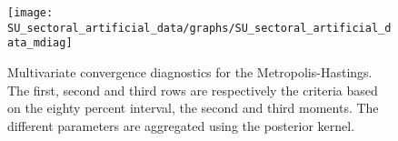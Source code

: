 
\begin{figure}[H]
\centering 
\texttt{[image: SU\_sectoral\_artificial\_data/graphs/SU\_sectoral\_artificial\_data\_mdiag]}
\caption{Multivariate convergence diagnostics for the Metropolis-Hastings.
The first, second and third rows are respectively the criteria based on
the eighty percent interval, the second and third moments. The different 
parameters are aggregated using the posterior kernel.}\label{Fig:MultivariateDiagnostics}
\end{figure}

